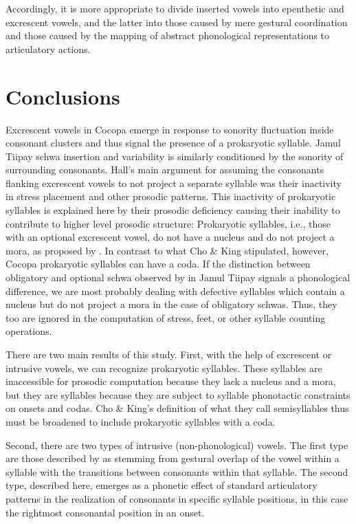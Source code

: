 \documentclass[output=paper,colorlinks,citecolor=brown]{langscibook}
\begin{document}
Accordingly, it is more appropriate to divide inserted vowels into epenthetic and excrescent vowels, and the latter into those caused by mere gestural coordination and those caused by the mapping of abstract phonological representations to articulatory actions.   

\section{Conclusions} \label{kramer:concl}
\largerpage
Excrescent vowels in Cocopa emerge in response to sonority fluctuation inside consonant clusters and thus signal the presence of a pro\-karyotic syllable. Jamul Tiipay schwa insertion and variability is similarly conditioned by the sonority of surrounding consonants. Hall's main argument for assuming the consonants flanking excrescent vowels to not project a separate syllable was their inactivity in stress placement and other prosodic patterns. This inactivity of prokaryotic syllables is explained here by their prosodic deficiency causing their inability to contribute to higher level prosodic structure: Prokaryotic syllables, i.e., those with an optional excrescent vowel, do not have a nucleus and do not project a mora, as proposed by \citeauthor{ChoHolloway2003}. In contrast to what Cho \& King stipulated, however, Cocopa prokaryotic syllables can have a coda. If the distinction between obligatory and optional schwa observed by \citeauthor{Miller2001} in Jamul Tiipay signals a phonological difference, we are most probably dealing with defective syllables which contain a nucleus but do not project a mora in the case of obligatory schwas. Thus, they too are ignored in the computation of stress, feet, or other syllable counting operations. 

There are two main results of this study. First, with the help of excrescent or intrusive vowels, we can recognize prokaryotic syllables. These syllables are inaccessible for prosodic computation because they lack a nucleus and a mora, but they are syllables because they are subject to syllable phonotactic constraints on onsets and codas. Cho \& King’s definition of what they call semisyllables thus must be broadened to include prokaryotic syllables with a coda.

Second, there are two types of intrusive (non-phonological) vowels. The first type are those described by \citeauthor{Hall2006} as stemming from gestural overlap of the vowel within a syllable with the transitions between consonants within that syllable. The second type, described here, emerges as a phonetic effect of standard articulatory patterns in the realization of consonants in specific syllable positions, in this case the rightmost consonantal position in an onset.




{\sloppy\printbibliography[heading=subbibliography,notkeyword=this]}
\end{document}
